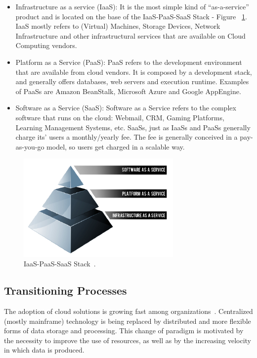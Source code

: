 \documentclass{article}
\begin{document}
\begin{itemize}
   \item{Infrastructure as a service (IaaS): It is the most simple kind of ``as-a-service'' product and is located on the base of the IaaS-PaaS-SaaS Stack - Figure ~\ref{fig:cloudstach}. IaaS mostly refers to (Virtual) Machines, Storage Devices, Network Infrastructure and other infrastructural services that are available on Cloud Computing vendors.}
   \item{Platform as a Service (PaaS): PaaS refers to the development environment that are available from cloud vendors. It is composed by a development stack, and generally offers databases, web servers and execution runtime. Examples of PaaSs are Amazon BeanStalk, Microsoft Azure and Google AppEngine.  }
   \item{Software as a Service (SaaS): Software as a Service refers to the complex software that runs on the cloud: Webmail, CRM, Gaming Platforms, Learning Management Systems, etc. SaaSs, just as IaaSs and PaaSs generally charge its' users a monthly/yearly fee. The fee is generally conceived in a pay-as-you-go model, so users get charged in a scalable way.  
}

\end{itemize}

\begin{figure}[ht!]
\centering
\includegraphics[width=80mm]{cloud_stack.png}
\caption{IaaS-PaaS-SaaS Stack~\cite{kepes2011understanding}.\label{fig:cloudstach}}
\end{figure}


\subsection{Transitioning Processes}
The adoption of cloud solutions is growing fast among organizations~\cite{6546068}.
Centralized (mostly mainframe) technology is being replaced by distributed and more flexible forms of data storage and processing.
This change of paradigm is motivated by the necessity to improve the use of resources, as well as by the increasing velocity in which data is produced.
\end{document}
